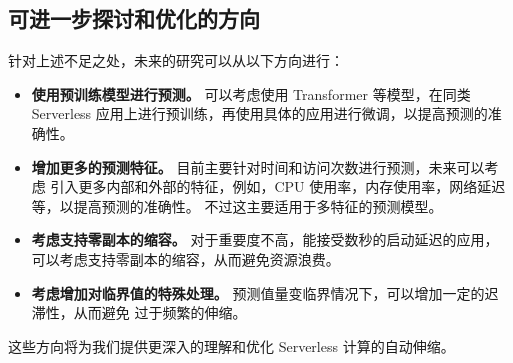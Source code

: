 \documentclass[a4paper,AutoFakeBold,oneside,12pt]{book}
\begin{document}
\subsection{可进一步探讨和优化的方向}
针对上述不足之处，未来的研究可以从以下方向进行：

\begin{itemize}
	\item \textbf{使用预训练模型进行预测。} 可以考虑使用 Transformer 等模型，在同类 Serverless
	应用上进行预训练，再使用具体的应用进行微调，以提高预测的准确性\cite{wu2020deep}。

	\item \textbf{增加更多的预测特征。} 目前主要针对时间和访问次数进行预测，未来可以考虑
	引入更多内部和外部的特征，例如，CPU 使用率，内存使用率，网络延迟等，以提高预测的准确性。
	不过这主要适用于多特征的预测模型。

	\item \textbf{考虑支持零副本的缩容。} 对于重要度不高，能接受数秒的启动延迟的应用，
	可以考虑支持零副本的缩容，从而避免资源浪费。

	\item \textbf{考虑增加对临界值的特殊处理。} 预测值量变临界情况下，可以增加一定的迟滞性，从而避免
	过于频繁的伸缩。

\end{itemize}
这些方向将为我们提供更深入的理解和优化 Serverless 计算的自动伸缩。


 
\end{document}
